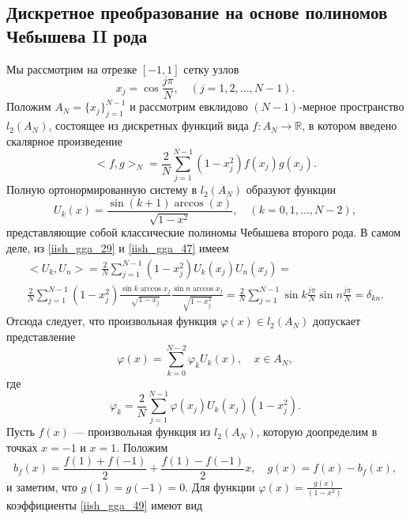     \subsection{Дискретное преобразование на основе полиномов Чебышева II рода}
Мы рассмотрим на отрезке $[-1,1]$ сетку узлов
\begin{equation*}
  x_j = \cos\frac{j\pi}{N}, \quad (j=1,2,...,N-1).
\end{equation*}
Положим $A_N = \{x_j\}_{j=1}^{N-1}$ и рассмотрим евклидово $(N-1)$-мерное пространство $l_2(A_N)$, состоящее из
дискретных функций вида $f: A_N \rightarrow \mathbb{R}$, в котором введено скалярное произведение
\begin{equation}
  <f,g>_N = \frac{2}{N}\sum\limits_{j=1}^{N-1}(1-x^2_j)f(x_j)g(x_j). \label{iish_gga_46}
\end{equation}
Полную ортонормированную систему в $l_2(A_N)$ образуют функции
\begin{equation}
  U_k(x) = \frac{\sin(k+1)\arccos(x)}{\sqrt{1-x^2}}, \quad (k=0,1,...,N-2), \label{iish_gga_47}
\end{equation}
представляющие собой классические полиномы Чебышева второго рода. В самом деле, из \eqref{iish_gga_29} и \eqref{iish_gga_47}
имеем
\begin{multline*}
  <U_k, U_n> = \frac{2}{N} \sum\limits_{j=1}^{N-1} (1 - x_j^2) U_k(x_j)U_n(x_j) = \\
  \frac2N\sum\limits_{j=1}^{N-1}(1-x_j^2)\frac{\sin k\arccos x_j}{\sqrt{1-x_j}}\frac{\sin n\arccos x_j}{\sqrt{1-x_j^2}}=
  \frac2N\sum\limits_{j=1}^{N-1}\sin k \frac{j\pi}{N}\sin n\frac{j\pi}{N} = \delta_{kn}.
\end{multline*}
Отсюда следует, что произвольная функция $\varphi(x) \in l_2(A_N)$ допускает представление
\begin{equation}
  \varphi(x) = \sum\limits_{k=0}^{N-2} \varphi_k U_k(x), \quad x \in A_N, \label{iish_gga_48}
\end{equation}
где
\begin{equation}
  \varphi_k = \frac2N \sum\limits_{j=1}^{N-1} \varphi(x_j)U_k(x_j)(1-x_j^2). \label{iish_gga_49}
\end{equation}
Пусть $f(x)$ --- произвольная функция из $l_2(A_N)$, которую доопределим в точках $x=-1$ и $x=1$. Положим
\begin{equation*}
  b_f(x)=\frac{f(1)+f(-1)}{2}+\frac{f(1)-f(-1)}{2}x, \quad g(x)=f(x)-b_f(x),
\end{equation*}
и заметим, что $g(1)=g(-1)=0$. Для функции $\varphi(x)=\frac{g(x)}{(1-x^2)}$ коэффициенты \eqref{iish_gga_49} имеют вид
